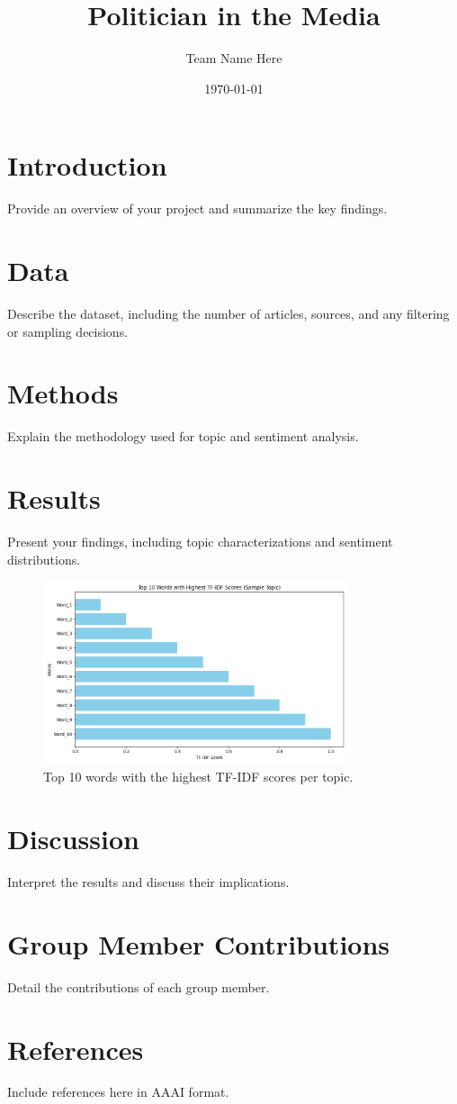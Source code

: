 \documentclass[12pt]{article}
\title{Politician in the Media}
\author{Team Name Here}
\date{\today}
\begin{document}
\maketitle

\section{Introduction}
Provide an overview of your project and summarize the key findings.

\section{Data}
Describe the dataset, including the number of articles, sources, and any filtering or sampling decisions.

\section{Methods}
Explain the methodology used for topic and sentiment analysis.

\section{Results}
Present your findings, including topic characterizations and sentiment distributions.

\begin{figure}[H]
    \centering
    \includegraphics[width=0.8\textwidth]{./figures/top_tfidf_words.png}
    \caption{Top 10 words with the highest TF-IDF scores per topic.}
    \label{fig:tfidf}
\end{figure}

\section{Discussion}
Interpret the results and discuss their implications.

\section{Group Member Contributions}
Detail the contributions of each group member.

\section{References}
Include references here in AAAI format.
\end{document}

